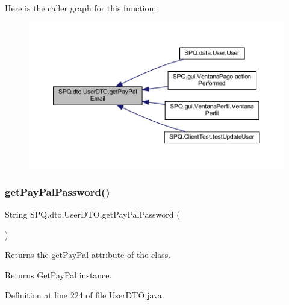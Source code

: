 Here is the caller graph for this function\+:\nopagebreak
\begin{figure}[H]
\begin{center}
\leavevmode
\includegraphics[width=350pt]{class_s_p_q_1_1dto_1_1_user_d_t_o_a42f2eecae334e6e937419b1c201cb1f2_icgraph}
\end{center}
\end{figure}
\mbox{\label{class_s_p_q_1_1dto_1_1_user_d_t_o_ab024e5157674f9bc382edfda06c348ec}} 
\subsubsection{\texorpdfstring{get\+Pay\+Pal\+Password()}{getPayPalPassword()}}
{\footnotesize\ttfamily String S\+P\+Q.\+dto.\+User\+D\+T\+O.\+get\+Pay\+Pal\+Password (\begin{DoxyParamCaption}{ }\end{DoxyParamCaption})}

Returns the get\+Pay\+Pal attribute of the class. \begin{DoxyReturn}{Returns}
Get\+Pay\+Pal instance. 
\end{DoxyReturn}


Definition at line 224 of file User\+D\+T\+O.\+java.

